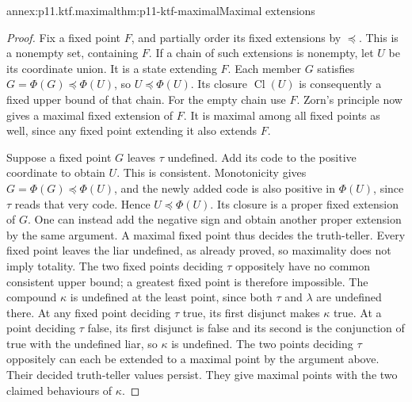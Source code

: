 \begin{annexitem}{annex:p11.ktf.maximal}{thm:p11-ktf-maximal}{Maximal extensions}
\begin{proof}
Fix a fixed point \(F\), and partially order its fixed extensions by
\(\preceq\). This is a nonempty set, containing \(F\). If a chain
of such extensions is nonempty, let \(U\) be its coordinate union.
It is a state extending \(F\). Each member \(G\) satisfies
\(G=\Phi(G)\preceq\Phi(U)\), so \(U\preceq\Phi(U)\).
Its closure \(\operatorname{Cl}(U)\) is consequently a fixed upper
bound of that chain. For the empty chain use \(F\). Zorn's principle
now gives a maximal fixed extension of \(F\). It is maximal among
all fixed points as well, since any fixed point extending it also
extends \(F\).

Suppose a fixed point \(G\) leaves \(\tau\) undefined. Add its
code to the positive coordinate to obtain \(U\). This is consistent.
Monotonicity gives \(G=\Phi(G)\preceq\Phi(U)\), and the newly
added code is also positive in \(\Phi(U)\), since \(\tau\) reads
that very code. Hence \(U\preceq\Phi(U)\). Its closure is a proper
fixed extension of \(G\). One can instead add the negative sign and
obtain another proper extension by the same argument. A maximal fixed
point thus decides the truth-teller. Every fixed point leaves the liar
undefined, as already proved, so maximality does not imply totality.
The two fixed points deciding \(\tau\) oppositely have no common
consistent upper bound; a greatest fixed point is therefore impossible.
The compound \(\kappa\) is undefined at the least point, since both
\(\tau\) and \(\lambda\) are undefined there. At any fixed point
deciding \(\tau\) true, its first disjunct makes \(\kappa\) true.
At a point deciding \(\tau\) false, its first disjunct is false and
its second is the conjunction of true with the undefined liar, so
\(\kappa\) is undefined. The two points deciding \(\tau\)
oppositely can each be extended to a maximal point by the argument above.
Their decided truth-teller values persist. They give maximal points
with the two claimed behaviours of \(\kappa\).
\end{proof}
\end{annexitem}

